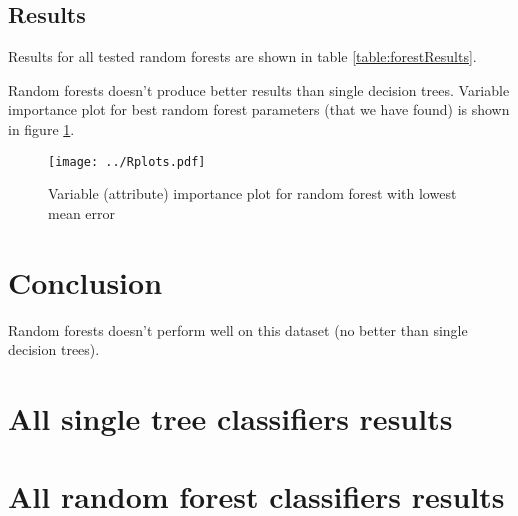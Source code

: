 \documentclass[a4paper]{article}
\begin{document}
\begin{multicols}{2}
\subsection{Results}
\label{singleConc}
Results for all tested random forests are shown in table \ref{table:forestResults}.

Random forests doesn't produce better results than single decision trees.
Variable importance plot for best random forest parameters (that we have found)
is shown in figure \ref{fig:importance}.


\begin{figure}[H]
    \centering
    \texttt{[image: ../Rplots.pdf]}
    \label{fig:importance}
    \caption[]{Variable (attribute) importance plot for random forest with lowest mean error}
\end{figure}


% 
% 
\section{Conclusion}

Random forests doesn't perform well on this dataset (no better than single decision trees).



\end{multicols}

\newpage
\appendix
\section{All single tree classifiers results}
% 


\newpage
\section{All random forest classifiers results}
% 

\end{document}
